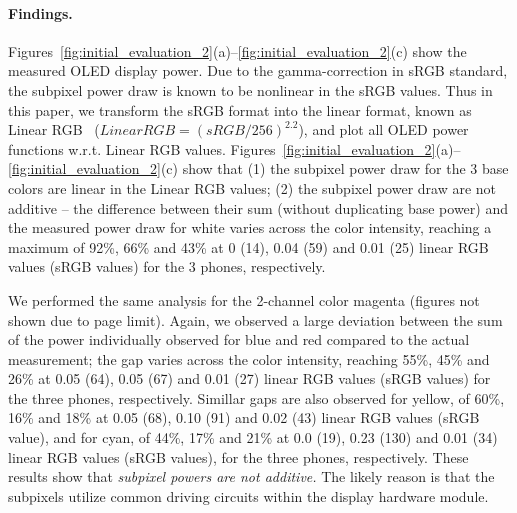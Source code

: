 \paragraph{Findings.}
{
Figures~\ref{fig:initial_evaluation_2}(a)--\ref{fig:initial_evaluation_2}(c)
show the measured OLED display power. Due to the gamma-correction in sRGB standard,
the subpixel power draw is known to be nonlinear in the sRGB values.
Thus in this paper, we transform the sRGB format into the linear format, known as Linear RGB~\cite{gammaCorrection1} ({$Linear RGB = (sRGB/256)^{2.2}$}),
and plot all OLED power functions w.r.t. Linear RGB values.
Figures~\ref{fig:initial_evaluation_2}(a)--\ref{fig:initial_evaluation_2}(c) show that
(1) the subpixel power draw for the 3 base colors are linear in the Linear RGB values;
(2) the subpixel power draw are not additive -- 
the difference between their sum (without duplicating base power)
and the measured power draw for white
varies across the color intensity, reaching
a maximum of 92\%, 66\% and 43\% at
0 (14), 0.04 (59) and 0.01 (25) linear RGB values (sRGB values) for the 3 phones, respectively.


We performed the same analysis for the 2-channel color magenta
(figures not shown due to page limit). Again, we
observed a large deviation between the sum of the power individually observed for blue and
red compared to the actual measurement; the gap
varies across the color intensity, reaching
55\%, 45\% and 26\% at 0.05 (64), 0.05 (67) and 0.01 (27) linear RGB values (sRGB values)
for the three phones, respectively.
Simillar gaps are also observed for yellow, \eg of
60\%, 16\% and 18\% at 0.05 (68), 0.10 (91) and 0.02 (43) linear RGB values (sRGB value),
and for cyan, of
44\%, 17\% and 21\% at 0.0 (19), 0.23 (130) and 0.01 (34) linear RGB values (sRGB values),
for the three phones, respectively.
These results show that
%
{\em subpixel powers are not additive.} The likely reason is that the
  subpixels utilize common driving circuits within the display
  hardware module.
}
  
